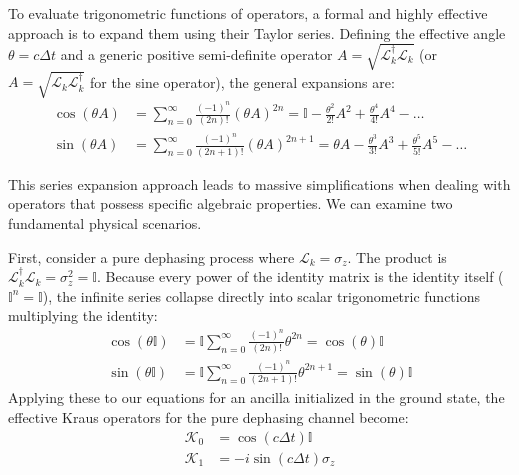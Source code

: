 \documentclass[a4paper,12pt]{article}
\begin{document}
To evaluate trigonometric functions of operators, a formal and highly effective approach is to expand them using their Taylor series. Defining the effective angle $\theta = c \Delta t$ and a generic positive semi-definite operator $A = \sqrt{\mathcal{L}_{k}^{\dagger} \mathcal{L}_{k}}$ (or $A = \sqrt{\mathcal{L}_{k} \mathcal{L}_{k}^{\dagger}}$ for the sine operator), the general expansions are:
\begin{align}
	\cos(\theta A) &= \sum_{n=0}^{\infty} \frac{(-1)^n}{(2n)!} (\theta A)^{2n} = \mathbb{I} - \frac{\theta^2}{2!} A^2 + \frac{\theta^4}{4!} A^4 - \dots \\
	\sin(\theta A) &= \sum_{n=0}^{\infty} \frac{(-1)^n}{(2n+1)!} (\theta A)^{2n+1} = \theta A - \frac{\theta^3}{3!} A^3 + \frac{\theta^5}{5!} A^5 - \dots
\end{align}

This series expansion approach leads to massive simplifications when dealing with operators that possess specific algebraic properties. We can examine two fundamental physical scenarios.

First, consider a pure dephasing process where $\mathcal{L}_{k} = \sigma_{z}$. The product is $\mathcal{L}_{k}^{\dagger} \mathcal{L}_{k} = \sigma_{z}^2 = \mathbb{I}$. Because every power of the identity matrix is the identity itself ($\mathbb{I}^n = \mathbb{I}$), the infinite series collapse directly into scalar trigonometric functions multiplying the identity:
\begin{align}
	\cos(\theta \mathbb{I}) &= \mathbb{I} \sum_{n=0}^{\infty} \frac{(-1)^n}{(2n)!} \theta^{2n} = \cos(\theta) \mathbb{I} \\
	\sin(\theta \mathbb{I}) &= \mathbb{I} \sum_{n=0}^{\infty} \frac{(-1)^n}{(2n+1)!} \theta^{2n+1} = \sin(\theta) \mathbb{I}
\end{align}
Applying these to our equations for an ancilla initialized in the ground state, the effective Kraus operators for the pure dephasing channel become:
\begin{align}
	\mathcal{K}_{0} &= \cos(c \Delta t) \mathbb{I} \\
	\mathcal{K}_{1} &= -i \sin(c \Delta t) \sigma_{z}
\end{align}
\end{document}
